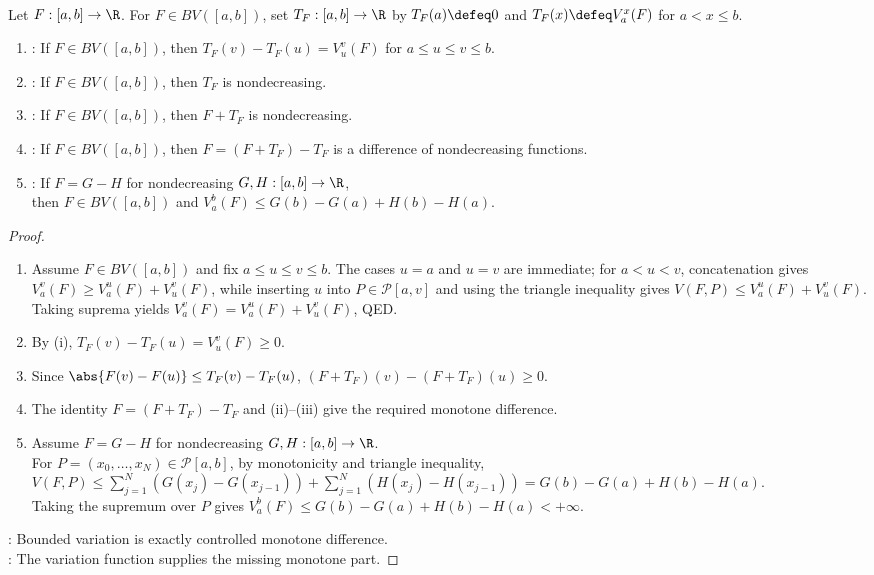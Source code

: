 \begin{theorem} \label{thm:jordan-decomposition-bounded-variation-functions} \\
Let $F:[a,b]\to\R$. For $F\in BV([a,b])$, set $T_F:[a,b]\to\R$ by $T_F(a)\defeq0$ and $T_F(x)\defeq V_a^x(F)$ for $a<x\leq b$.
\begin{enumerate}[label=(\roman*)]
\setlength{\itemsep}{0pt}
\item {}: If $F\in BV([a,b])$, then $T_F(v)-T_F(u)=V_u^v(F)$ for $a\leq u\leq v\leq b$.
\item {}: If $F\in BV([a,b])$, then $T_F$ is nondecreasing.
\item {}: If $F\in BV([a,b])$, then $F+T_F$ is nondecreasing.
\item {}: If $F\in BV([a,b])$, then $F=(F+T_F)-T_F$ is a difference of nondecreasing functions.
\item {}: If $F=G-H$ for nondecreasing $G,H:[a,b]\to\R$,\\
then $F\in BV([a,b])$ and $V_a^b(F)\leq G(b)-G(a)+H(b)-H(a)$.
\end{enumerate}
\begin{proof}
\begin{enumerate}[label=(\roman*)]
\setlength{\itemsep}{0pt}
\item Assume $F\in BV([a,b])$ and fix $a\leq u\leq v\leq b$. The cases $u=a$ and $u=v$ are immediate; for $a<u<v$, concatenation gives $V_a^v(F)\geq V_a^u(F)+V_u^v(F)$, while inserting $u$ into $P\in\mathcal{P}[a,v]$ and using the triangle inequality gives $V(F,P)\leq V_a^u(F)+V_u^v(F)$. Taking suprema yields $V_a^v(F)=V_a^u(F)+V_u^v(F)$, QED.
\item By (i), $T_F(v)-T_F(u)=V_u^v(F)\geq0$.
\item Since $\abs{F(v)-F(u)}\leq T_F(v)-T_F(u)$, $(F+T_F)(v)-(F+T_F)(u)\geq0$.
\item The identity $F=(F+T_F)-T_F$ and (ii)--(iii) give the required monotone difference.
\item Assume $F=G-H$ for nondecreasing $G,H:[a,b]\to\R$.\\
For $P=(x_0,\ldots,x_N)\in\mathcal{P}[a,b]$, by monotonicity and triangle inequality,\\
$V(F,P)\leq\sum\limits_{j=1}^N(G(x_j)-G(x_{j-1}))+\sum\limits_{j=1}^N(H(x_j)-H(x_{j-1}))=G(b)-G(a)+H(b)-H(a)$.\\
Taking the supremum over $P$ gives $V_a^b(F)\leq G(b)-G(a)+H(b)-H(a)<+\infty$.
\end{enumerate}
: Bounded variation is exactly controlled monotone difference.\\
: The variation function supplies the missing monotone part.
\end{proof}
\end{theorem}


